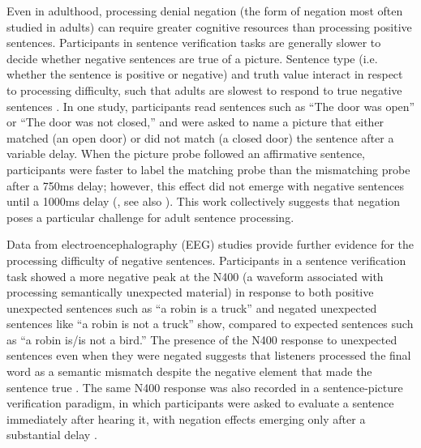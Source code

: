 \documentclass[man]{apa2}
\begin{document}
Even in adulthood, processing denial negation (the form of negation most often studied in adults) can require greater cognitive resources than processing positive sentences.  Participants in sentence verification tasks are generally slower to decide whether negative sentences are true of a picture.  Sentence type (i.e. whether the sentence is positive or negative) and truth value interact in respect to processing difficulty, such that adults are slowest to respond to true negative sentences \cite{hclark1972, just1971, just1976, carpenter1975}.  In one study, participants read sentences such as ``The door was open'' or ``The door was not closed,'' and were asked to name a picture that either matched (an open door) or did not match (a closed door) the sentence after a variable delay.  When the picture probe followed an affirmative sentence, participants were faster to label the matching probe than the mismatching probe after a 750ms delay; however, this effect did not emerge with negative sentences until a 1000ms delay (, see also ).  This work collectively suggests that negation poses a particular challenge for adult sentence processing.

Data from electroencephalography (EEG)  studies provide further evidence for the processing difficulty of negative sentences.  Participants in a sentence verification task showed a more negative peak at the N400 (a waveform associated with processing semantically unexpected material) in response to both positive unexpected sentences such as ``a robin is a truck'' and negated unexpected sentences like ``a robin is not a truck'' show, compared to expected sentences such as ``a robin is/is not a bird.''  The presence of the N400 response to unexpected sentences even when they were negated suggests that listeners processed the final word as a semantic mismatch despite the negative element that made the sentence true \cite{fischler1983}. The same N400 response was also recorded in a sentence-picture verification paradigm, in which participants were asked to evaluate a sentence immediately after hearing it, with negation effects emerging only after a substantial delay \cite{ludtke2008}.  
\end{document}
